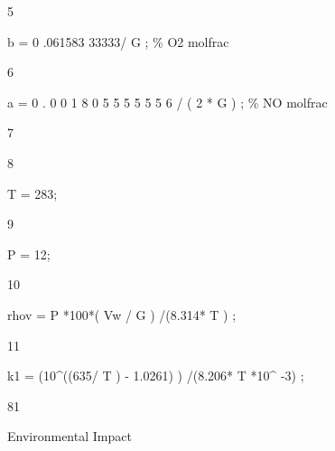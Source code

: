 \documentclass[a4paper,portrait,12pt]{article}
\begin{document}
5





\begin{flushleft}
b = 0 .061583 33333/ G ; \% O2 molfrac
\end{flushleft}





6





\begin{flushleft}
a = 0 . 0 0 1 8 0 5 5 5 5 5 5 6 / ( 2 * G ) ; \% NO molfrac
\end{flushleft}





7


8





\begin{flushleft}
T = 283;
\end{flushleft}





9





\begin{flushleft}
P = 12;
\end{flushleft}





10





\begin{flushleft}
rhov = P *100*( Vw / G ) /(8.314* T ) ;
\end{flushleft}





11





\begin{flushleft}
k1 = (10\^{}((635/ T ) - 1.0261) ) /(8.206* T *10\^{} -3) ;
\end{flushleft}





81





\begin{flushleft}
\newpage
Environmental Impact
\end{flushleft}
\end{document}
